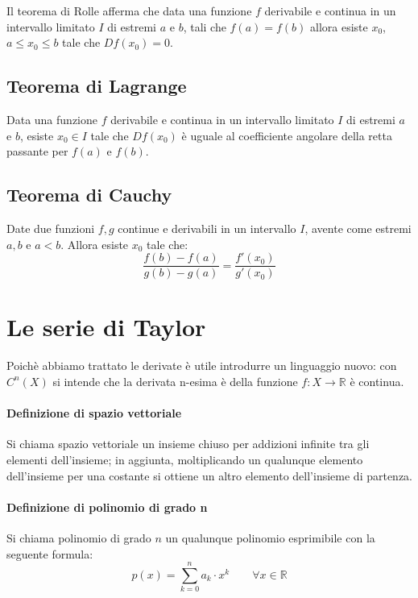 \documentclass{article}
\begin{document}
Il teorema di Rolle afferma che data una funzione $f$ derivabile e continua in un intervallo limitato $I$ di estremi $a$ e $b$, tali che $f(a)=f(b)$ allora esiste $x_0$, $a \leq x_0\leq b$ tale che $Df(x_0)=0$.

\subsection{Teorema di Lagrange}

Data una funzione $f$ derivabile e continua in un intervallo limitato $I$ di estremi $a$ e $b$, esiste $x_0 \in I $ tale che $Df(x_0)$ è uguale al coefficiente angolare della retta passante per $f(a)$ e $f(b)$.

\subsection{Teorema di Cauchy}

Date due funzioni $f, g$ continue  e derivabili in un intervallo $I$, avente come estremi $a,b$ e $a<b$. Allora esiste $x_0$ tale che:
\begin{equation}
	\frac{f(b)-f(a)}{g(b)-g(a)}=\frac{f'(x_0)}{g'(x_0)}
\end{equation}

\section{Le serie di Taylor}

Poichè abbiamo trattato le derivate è utile introdurre un linguaggio nuovo: con $C^n(X)$ si intende che la derivata n-esima è della funzione $f: X \rightarrow \mathbb{R}$ è continua.

\paragraph{Definizione di spazio vettoriale}
Si chiama spazio vettoriale un insieme chiuso per addizioni infinite tra gli elementi dell'insieme; in aggiunta, moltiplicando un qualunque elemento dell'insieme per una costante si ottiene un altro elemento dell'insieme di partenza.\\

\paragraph{Definizione di polinomio di grado n}
Si chiama polinomio di grado $n$ un qualunque polinomio esprimibile con la seguente formula:
\begin{equation*}
	p(x)=\sum_{k=0}^na_k \cdot x^k \qquad \forall x \in \mathbb{R}
\end{equation*}
\end{document}
